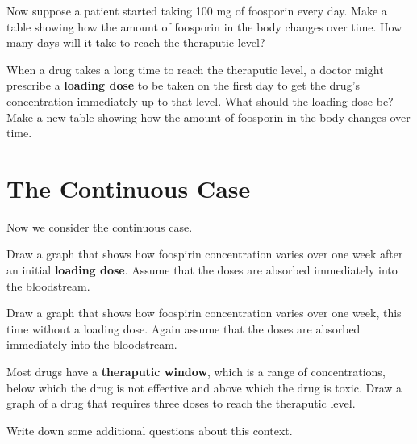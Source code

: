 \documentclass[space,handout]{ximera}
\begin{document}
\begin{question}
Now suppose a patient started taking 100 mg of foosporin every day.  Make a table showing how the amount of foosporin in the body changes over time.  How many days will it take to reach the theraputic level?  
\begin{freeResponse}
\end{freeResponse}
\end{question}

\begin{question}
When a drug takes a long time to reach the theraputic level, a doctor might prescribe a \textbf{loading dose} to be taken on the first day to get the drug's concentration immediately up to that level.  What should the loading dose be?  Make a new table showing how the amount of foosporin in the body changes over time.  
\begin{freeResponse}
\end{freeResponse}
\end{question}

\section{The Continuous Case}
Now we consider the continuous case.  
\begin{question}
Draw a graph that shows how foospirin concentration varies over one week after an initial \textbf{loading dose}.  Assume that the doses are absorbed immediately into the bloodstream.  
\begin{freeResponse}
\end{freeResponse}
\end{question}

\begin{question}
Draw a graph that shows how foospirin concentration varies over one week, this time without a loading dose.  Again assume that the doses are absorbed immediately into the bloodstream.  
\begin{freeResponse}
\end{freeResponse}
\end{question}

\newpage
\begin{question}
Most drugs have a \textbf{theraputic window}, which is a range of concentrations, below which the drug is not effective and above which the drug is toxic.  Draw a graph of a drug that requires three doses to reach the theraputic level.  
\begin{freeResponse}
\end{freeResponse}
\end{question}

\begin{question}
Write down some additional questions about this context.       
\begin{freeResponse}
\end{freeResponse}
\end{question}
\end{document}
